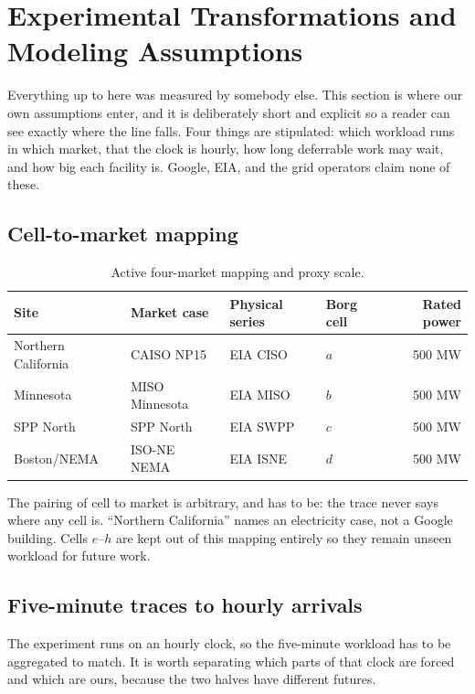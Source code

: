 ﻿\documentclass[12pt]{article}
\begin{document}
\section{Experimental Transformations and Modeling Assumptions}
\label{sec:experimental-transformations}

Everything up to here was measured by somebody else. This section is where our
own assumptions enter, and it is deliberately short and explicit so a reader can
see exactly where the line falls. Four things are stipulated: which workload
runs in which market, that the clock is hourly, how long deferrable work may
wait, and how big each facility is. Google, EIA, and the grid operators claim
none of these.

\subsection{Cell-to-market mapping}
\label{subsec:transform-mapping}

\begin{table}[htbp]
  \centering
  \caption{Active four-market mapping and proxy scale.}
  \label{tab:active-market-map}
  \begin{tabular}{@{}llllr@{}}
    \toprule
    Site & Market case & Physical series & Borg cell & Rated power \\
    \midrule
    Northern California & CAISO NP15 & EIA CISO & \(a\) & 500 MW \\
    Minnesota & MISO Minnesota & EIA MISO & \(b\) & 500 MW \\
    SPP North & SPP North & EIA SWPP & \(c\) & 500 MW \\
    Boston/NEMA & ISO-NE NEMA & EIA ISNE & \(d\) & 500 MW \\
    \bottomrule
  \end{tabular}
\end{table}

The pairing of cell to market is arbitrary, and has to be: the trace never says
where any cell is. ``Northern California'' names an electricity case, not a
Google building. Cells \(e\)--\(h\) are kept out of this mapping entirely so
they remain unseen workload for future work.

\subsection{Five-minute traces to hourly arrivals}
\label{subsec:transform-hourly-workload}

The experiment runs on an hourly clock, so the five-minute workload has to be
aggregated to match. It is worth separating which parts of that clock are forced
and which are ours, because the two halves have different futures.
\end{document}

